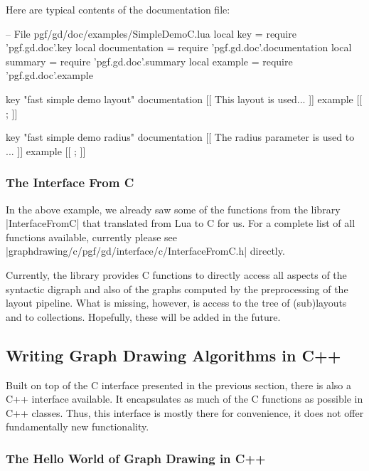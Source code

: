 Here are typical contents of the documentation file:
%
\begin{codeexample}[code only, tikz syntax=false]
-- File pgf/gd/doc/examples/SimpleDemoC.lua
local key           = require 'pgf.gd.doc'.key
local documentation = require 'pgf.gd.doc'.documentation
local summary       = require 'pgf.gd.doc'.summary
local example       = require 'pgf.gd.doc'.example

key           "fast simple demo layout"
documentation
[[
This layout is used...
]]
example
[[
\tikz {};
]]

key           "fast simple demo radius"
documentation
[[
The radius parameter is used to ...
]]
example
[[
\tikz {};
]]
\end{codeexample}


\subsubsection{The Interface From C}

In the above example, we already saw some of the functions from the library
|InterfaceFromC| that translated from Lua to C for us. For a complete list of
all functions available, currently please see
|graphdrawing/c/pgf/gd/interface/c/InterfaceFromC.h| directly.

Currently, the library provides C functions to directly access all aspects of
the syntactic digraph and also of the graphs computed by the preprocessing of
the layout pipeline. What is missing, however, is access to the tree of
(sub)layouts and to collections. Hopefully, these will be added in the future.


\subsection{Writing Graph Drawing Algorithms in C++}
\label{section-gd-c++}

Built on top of the C interface presented in the previous section, there is
also a C++ interface available. It encapsulates as much of the C functions as
possible in C++ classes. Thus, this interface is mostly there for convenience,
it does not offer fundamentally new functionality.


\subsubsection{The Hello World of Graph Drawing in C++}

